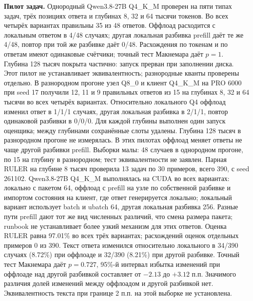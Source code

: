 \textbf{Пилот задач.} Однородный Qwen3.8-27B Q4\_K\_M проверен на пяти типах задач,
трёх позициях ответа и глубинах 8, 32 и 64 тысячи токенов. Во всех четырёх вариантах правильны 35 из 48 ответов.
Оффлоад расходится с локальным ответом в 4/48 случаях; другая локальная разбивка prefill даёт те же 4/48, повтор при той же разбивке даёт 0/48.
Расхождения по токенам и по ответам имеют одинаковые счётчики; точный тест Макнемара даёт $p=1$.
Глубина 128 тысяч покрыта частично: запуск прерван при заполнении диска.
Этот пилот не устанавливает эквивалентность; разнородные кванты проверены отдельно.
В разнородном прогоне узел Q8\_0 и клиент Q4\_K\_M на PRO 6000 при seed 17 получили
12, 11 и 9 правильных ответов из 15 на глубинах 8, 32 и 64 тысячи во всех четырёх вариантах.
Относительно локального Q4 оффлоад изменил ответ в 1/1/1 случаях, другая локальная разбивка
в 2/1/1, повтор одинаковой разбивки в 0/0/0. Для каждой глубины выполнен один запуск оценщика;
между глубинами сохранённые слоты удалены. Глубина 128 тысяч в разнородном прогоне не измерялась.
В этих пилотах оффлоад меняет ответы не чаще другой разбивки prefill. Выборки малы:
48 случаев в однородном прогоне, по 15 на глубину в разнородном; тест эквивалентности не заявлен.
Парная RULER на глубине 8 тысяч проверила 13 задач по 30 примеров, всего 390, с seed 261102.
Qwen3.8-27B Q4\_K\_M выполнялась на CUDA во всех вариантах: локально с пакетом 64,
оффлоад с prefill на узле по собственной разбивке и импортом состояния на клиент, где ответ генерируется локально;
локальный вариант использует batch и ubatch 64, другая локальная разбивка 256.
Разные пути prefill дают тот же вид численных различий, что смена размера пакета;
runbook не устанавливает более узкий механизм для этих ответов. Оценка RULER равна 97.01\% во всех трёх вариантах;
расхождений оценок отдельных примеров 0 из 390. Текст ответа изменился относительно локального
в 34/390 случаях (8.72\%) при оффлоаде и 32/390 (8.21\%) при другой разбивке.
Точный тест Макнемара даёт $p=0.727$, 95\%-й интервал избытка изменений при оффлоаде над другой разбивкой составляет от $-2.13$ до $+3.12$ п.п.
Значимого различия долей изменений между оффлоадом и другой разбивкой нет.
Эквивалентность текста при границе 2 п.п. на этой выборке не установлена.


